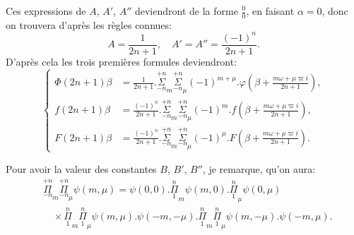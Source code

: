 \documentclass{article}
\begin{document}
Ces expressions de $A$, $A'$, $A''$ deviendront de la forme $\frac{0}{0}$, en faisant $\alpha=0$, donc on trouvera d'après les règles connues:
\[ A=\frac{1}{2n+1},\quad A'=A''=\frac{(-1)^{n}}{2n+1}. \]
D'après cela les trois premières formules deviendront:
\[ \left\{\begin{aligned}
\Phi(2n+1)\beta&=\frac{1}{2n+1}.\overset{+n}{\underset{-n}{\Sigma}}_{m}\overset{+n}{\underset{-n}{\Sigma}}_{\mu}(-1)^{m+\mu}.\varphi\left(\beta+\frac{m\omega+\mu\varpi i}{2n+1}\right),\\
f(2n+1)\beta&=\frac{(-1)^{n}}{2n+1}.\overset{+n}{\underset{-n}{\Sigma}}_{m}\overset{+n}{\underset{-n}{\Sigma}}_{\mu}(-1)^{m}.f\left(\beta+\frac{m\omega+\mu\varpi i}{2n+1}\right),\\
F(2n+1)\beta&=\frac{(-1)^{n}}{2n+1}.\overset{+n}{\underset{-n}{\Sigma}}_{m}\overset{+n}{\underset{-n}{\Sigma}}_{\mu}(-1)^{\mu}.F\left(\beta+\frac{m\omega+\mu\varpi i}{2n+1}\right).
\end{aligned}\right. \tag{126.} \]


Pour avoir la valeur des constantes $B$, $B'$, $B''$, je remarque, qu'on aura:
\[ \begin{aligned}
&\overset{+n}{\underset{-n}{\Pi}}_{m}\overset{+n}{\underset{-n}{\Pi}}_{\mu}\psi(m,\mu)=\psi(0,0).\overset{n}{\underset{1}{\Pi}}_{m}\psi(m,0).\overset{n}{\underset{1}{\Pi}}_{\mu}\psi(0,\mu)\\
&\quad\times\overset{n}{\underset{1}{\Pi}}_{m}\overset{n}{\underset{1}{\Pi}}_{\mu}\psi(m,\mu).\psi(-m,-\mu).\overset{n}{\underset{1}{\Pi}}_{m}\overset{n}{\underset{1}{\Pi}}_{\mu}\psi(m,-\mu).\psi(-m,\mu).
\end{aligned} \tag{127.} \]
\end{document}
